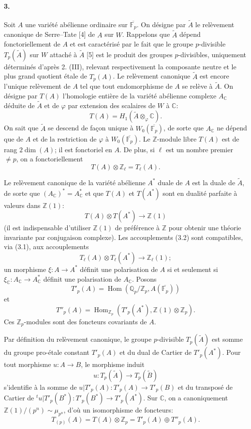 \documentclass[10pt]{article}
\newcommand{\C}{\mathbb C}
\newcommand{\Fp}{\mathbb F_p}
\newcommand{\Q}{\mathbb Q}
\newcommand{\Z}{\mathbb Z}
\newcommand{\Ac}{A_{\C}}
\newcommand{\Hom}{\operatorname{Hom}}
\begin{document}
\paragraph{3.} Soit $A$ une variété abélienne ordinaire sur $\overline{\Fp}$. On désigne par $\widetilde A$ le relèvement canonique de Serre--Tate [4] de $A$ sur $W$. Rappelons que $\widetilde A$ dépend fonctoriellement de $A$ et est caractérisé par le fait que le groupe $p$-divisible $T_p(\widetilde A)$ sur $W$ attaché à $\widetilde A$ [5] est le produit des groupes $p$-divisibles, uniquement déterminés d'après 2. (III), relevant respectivement la composante neutre et le plus grand quotient étale de $T_p(A)$. Le relèvement canonique $\widetilde A$ est encore l'unique relèvement de $A$ tel que tout endomorphisme de $A$ se relève à $\widetilde A$. On désigne par $T(A)$ l'homologie entière de la variété abélienne complexe $\Ac$ déduite de $\widetilde A$ et de $\varphi$ par extension des scalaires de $W$ à $\C$:
\[
T(A)=H_1(\widetilde A\otimes_{\varphi}\C).
\]
On sait que $\widetilde A$ se descend de façon unique à $W_0(\overline{\Fp})$, de sorte que $\Ac$ ne dépend que de $A$ et de la restriction de $\varphi$ à $W_0(\overline{\Fp})$. Le $\Z$-module libre $T(A)$ est de rang $2\dim(A)$; il est fonctoriel en $A$. De plus, si $\ell$ est un nombre premier $\ne p$, on a fonctoriellement
\[
\tag{3.1}
T(A)\otimes\Z_\ell=T_\ell(A).
\]

Le relèvement canonique de la variété abélienne $A^*$ duale de $A$ est la duale de $\widetilde A$, de sorte que $(\Ac)^*=A^*_{\C}$ et que $T(A)$ et $T(A^*)$ sont en dualité parfaite à valeurs dans $\Z(1)$:
\[
\tag{3.2}
T(A)\otimes T(A^*)\longrightarrow\Z(1)
\]
(il est indispensable d'utiliser $\Z(1)$ de préférence à $\Z$ pour obtenir une théorie invariante par conjugaison complexe). Les accouplements (3.2) sont compatibles, via (3.1), aux accouplements
\[
T_\ell(A)\otimes T_\ell(A^*)\longrightarrow\Z_\ell(1);
\]
un morphisme $\xi:A\to A^*$ définit une polarisation de $A$ si et seulement si $\xi_{\C}:\Ac\to A^*_{\C}$ définit une polarisation de $\Ac$. Posons
\[
T'_p(A)=\Hom(\Q_p/\Z_p,A(\overline{\Fp}))
\]
et
\[
T''_p(A)=\Hom_{\Z_p}(T'_p(A^*),\Z(1)\otimes\Z_p).
\]
Ces $\Z_p$-modules sont des foncteurs covariants de $A$.

Par définition du relèvement canonique, le groupe $p$-divisible $T_p(\widetilde A)$ est somme du groupe pro-étale constant $T'_p(A)$ et du dual de Cartier de $T'_p(A^*)$. Pour tout morphisme $u:A\to B$, le morphisme induit
\[
u:T_p(\widetilde A)\to T_p(\widetilde B)
\]
s'identifie à la somme de $u|T'_p(A):T'_p(A)\to T'_p(B)$ et du transposé de Cartier de ${}^tu|T'_p(B^*):T'_p(B^*)\to T'_p(A^*)$. Sur $\C$, on a canoniquement $\Z(1)/(p^n)\sim \mu_{p^n}$, d'où un isomorphisme de foncteurs:
\[
\tag{3.2}
T_{(p)}(A)=T(A)\otimes\Z_p=T'_p(A)\oplus T''_p(A).
\]
\end{document}
